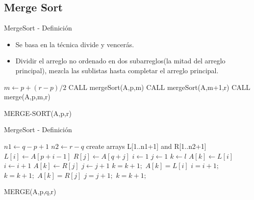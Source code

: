 \documentclass[11pt]{beamer}
\begin{document}
		\subsection{Merge Sort}
		\begin{frame}{MergeSort - Definición}
		     
	        \begin{itemize}
	            \item Se basa en la técnica divide y vencerás.
	            \item Dividir el arreglo no ordenado en dos subarreglos(la mitad del arreglo principal), mezcla las sublistas hasta completar el arreglo principal.
	            \end{itemize}
    		            
		      \begin{algorithm}[H]
                \begin{algorithmic}[1]
                            \STATE $m \gets p + (r-p)/2$ 
                            \STATE CALL mergeSort(A,p,m)
                            \STATE CALL mergeSort(A,m+1,r)
                            \STATE CALL merge(A,p,m,r)
                        \ENDIF
                \end{algorithmic}
                \caption{MERGE-SORT(A,p,r)}
                \label{alg:merge-sort}
            \end{algorithm}
		\end{frame}
		\begin{frame}{MergeSort - Definición}
		     \begin{algorithm}[H]
                \begin{algorithmic}[1]
                    \STATE $n1 \gets q-p+1$
                    \STATE $n2 \gets r-q$
                    \STATE create arrays L[1..n1+1] and R[1..n2+1]
                        \STATE $L[i] \gets A[p+i-1]$
                    \ENDFOR
                        \STATE $R[j] \gets A[q+j]$
                    \ENDFOR
                    \STATE $i \gets 1$
                    \STATE $j \gets 1$
                    \STATE $k \gets l$
                            \STATE $A[k] \gets L[i]$ 
                            \STATE $i \gets i + 1$ 
                        \ELSE
                            \STATE $A[k] \gets R[j]$ 
                            \STATE $j \gets j + 1$
                        \ENDIF
                        \STATE $k = k + 1;$
                    \ENDWHILE
                        \STATE $A[k] = L[i]$
                        \STATE $i = i + 1;$
                        \STATE $k = k + 1;$
                    \ENDWHILE
                        \STATE $A[k] = R[j]$
                        \STATE $j = j + 1;$
                        \STATE $k = k + 1;$
                    \ENDWHILE
                \end{algorithmic}
                \caption{MERGE(A,p,q,r)}
                \label{alg:merge}
            \end{algorithm}
		\end{frame}
\end{document}
